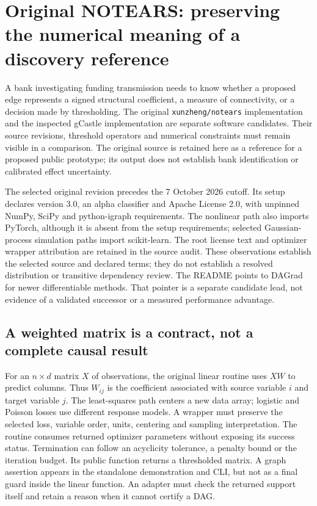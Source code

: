 \section{Original NOTEARS: preserving the numerical meaning of a discovery reference}
\label{exec23:notears-scope}
A bank investigating funding transmission needs to know whether a proposed
edge represents a signed structural coefficient, a measure of connectivity,
or a decision made by thresholding. The original \texttt{xunzheng/notears}
implementation and the inspected gCastle implementation are separate software
candidates. Their source revisions, threshold operators and numerical
constraints must remain visible in a comparison. The original source is
retained here as a reference for a proposed public prototype; its output does
not establish bank identification or calibrated effect uncertainty.
\citep{exec23_notears_source,exec20_gcastle_source}

The selected original revision precedes the 7 October 2026 cutoff. Its
setup declares version 3.0, an alpha classifier and Apache License 2.0,
with unpinned NumPy, SciPy and python-igraph requirements. The nonlinear
path also imports PyTorch, although it is absent from the setup requirements;
selected Gaussian-process simulation paths import scikit-learn. The root
license text and optimizer wrapper attribution are retained in the source
audit. These observations establish the selected source and declared terms;
they do not establish a resolved distribution or transitive dependency review.
The README points to DAGrad for newer differentiable methods. That pointer is
a separate candidate lead, not evidence of a validated successor or a measured
performance advantage.\citep{exec23_notears_source}

\subsection{A weighted matrix is a contract, not a complete causal result}
\label{exec23:notears-matrix}
For an $n\times d$ matrix $X$ of observations, the original linear routine uses
$XW$ to predict columns. Thus $W_{ij}$ is the coefficient associated with
source variable $i$ and target variable $j$. The least-squares path centers a
new data array; logistic and Poisson losses use different response models.
A wrapper must preserve the selected loss, variable order, units, centering
and sampling interpretation. The routine consumes returned optimizer
parameters without exposing its success status. Termination can follow an
acyclicity tolerance, a penalty bound or the iteration budget. Its public
function returns a thresholded matrix. A graph assertion appears in the
standalone demonstration and CLI, but not as a final guard inside the linear
function. An adapter must check the returned support itself and retain a
reason when it cannot certify a DAG.\citep{exec23_notears_source}

